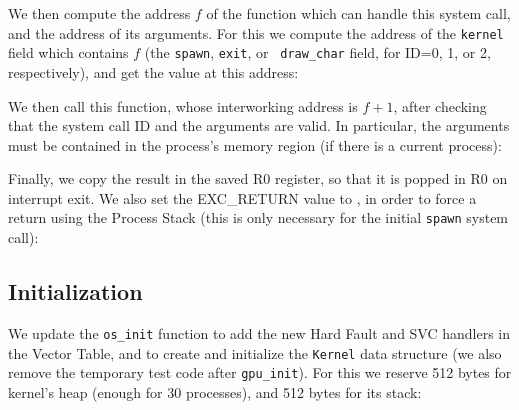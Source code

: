 We then compute the address $f$ of the function which can handle this system
call, and the address of its arguments. For this we compute the address of the
{\tt kernel} field which contains $f$ (the {\tt spawn}, {\tt exit}, or {\tt
draw\_char} field, for ID=0, 1, or 2, respectively), and get the value at this
address:


We then call this function, whose interworking address is $f+1$, after checking
that the system call ID and the arguments are valid. In particular, the
arguments must be contained in the process's memory region (if there is a
current process):


Finally, we copy the result in the saved R0 register, so that it is popped in
R0 on interrupt exit. We also set the EXC\_RETURN value to
, in order to force a return using the Process Stack
(this is only necessary for the initial {\tt spawn} system call):


\subsection{Initialization}


We update the {\tt os\_init} function to add the new Hard Fault and SVC
handlers in the Vector Table, and to create and initialize the {\tt Kernel}
data structure (we also remove the temporary test code after {\tt gpu\_init}).
For this we reserve 512 bytes for kernel's heap (enough for 30 processes), and
512 bytes for its stack:

